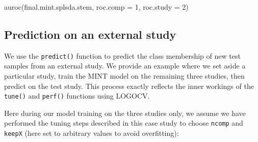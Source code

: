 \documentclass[
]{book}
\newenvironment{Shaded}{\begin{snugshade}}{\end{snugshade}}
\newcommand{\AttributeTok}[1]{\textcolor[rgb]{0.77,0.63,0.00}{#1}}
\newcommand{\DecValTok}[1]{\textcolor[rgb]{0.00,0.00,0.81}{#1}}
\newcommand{\FunctionTok}[1]{\textcolor[rgb]{0.00,0.00,0.00}{#1}}
\newcommand{\NormalTok}[1]{#1}
\newcommand{\StringTok}[1]{\textcolor[rgb]{0.31,0.60,0.02}{#1}}
\begin{document}
\begin{Shaded}
\begin{Highlighting}[]
\FunctionTok{auroc}\NormalTok{(final.mint.splsda.stem, }\AttributeTok{roc.comp =} \DecValTok{1}\NormalTok{, }\AttributeTok{roc.study =} \StringTok{\textquotesingle{}2\textquotesingle{}}\NormalTok{)}
\end{Highlighting}
\end{Shaded}



\hypertarget{detour:mint:predict}{%
\subsection{Prediction on an external study}\label{detour:mint:predict}}

We use the \texttt{predict()} function to predict the class membership of new test samples from an external study. We provide an example where we set aside a particular study, train the MINT model on the remaining three studies, then predict on the test study. This process exactly reflects the inner workings of the \texttt{tune()} and \texttt{perf()} functions using LOGOCV.

Here during our model training on the three studies only, we assume we have performed the tuning steps described in this case study to choose \texttt{ncomp} and \texttt{keepX} (here set to arbitrary values to avoid overfitting):
\end{document}
